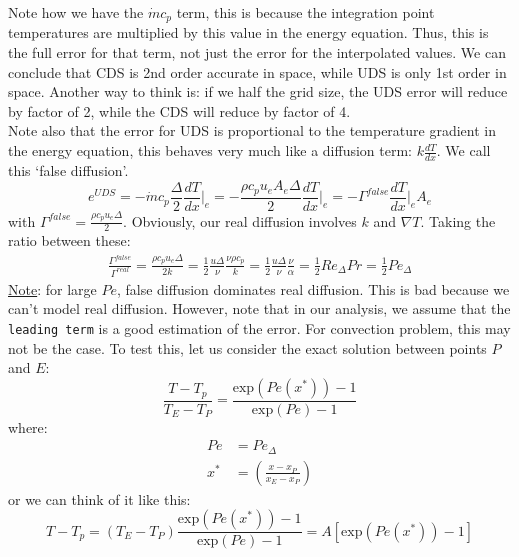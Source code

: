 \documentclass[11pt]{article}
\begin{document}
Note how we have the \(\dot{m}c_p\) term, this is because the integration point temperatures are multiplied by this value in
the energy equation. Thus, this is the full error for that term, not just the error for the interpolated values. We can conclude
that CDS is 2nd order accurate in space, while UDS is only 1st order in space. Another way to think is: if we half the grid size,
the UDS error will reduce by factor of 2, while the CDS will reduce by factor of 4.\\
Note also that the error for UDS is proportional to the temperature gradient in the energy equation, this behaves very much like
a diffusion term: \(k\frac{dT}{dx}\). We call this `false diffusion'.
\begin{equation*}
e^{UDS} = -\dot{m}c_p \frac{\Delta}{2}\frac{dT}{dx}\biggr \rvert_e = -\frac{\rho c_p u_e A_e \Delta}{2}\frac{dT}{dx}\biggr\rvert_e
= -\Gamma^{false}\frac{dT}{dx}\biggr\rvert_e A_e
\end{equation*}
with \(\Gamma^{false} = \frac{\rho c_p u_e \Delta}{2}\). Obviously, our real diffusion involves \(k\) and \(\nabla T\). Taking the ratio
between these:
\begin{equation*}
\begin{aligned}
\frac{\Gamma^{false}}{\Gamma^{real}} = \frac{\rho c_p u_e \Delta}{2k} = \frac{1}{2}\frac{u\Delta}{\nu}\frac{\nu \rho c_p }{k}
= \frac{1}{2}\frac{u\Delta}{\nu}\frac{\nu}{\alpha} = \frac{1}{2}Re_\Delta Pr = \frac{1}{2}Pe_\Delta
\end{aligned}
\end{equation*}
\uline{Note}: for large \(Pe\), false diffusion dominates real diffusion. This is bad because we can't model real diffusion. However,
note that in our analysis, we assume that the \texttt{leading term} is a good estimation of the error. For convection problem, this may
not be the case. To test this, let us consider the exact solution between points \(P\) and \(E\):
\begin{equation*}
\frac{T-T_p}{T_E-T_P} = \frac{\textrm{exp}(Pe (x^*))-1}{\textrm{exp}(Pe)-1}
\end{equation*}
where:
\begin{equation*}
\begin{aligned}
Pe &= Pe_\Delta\\
x^* &= \left( \frac{x-x_P}{x_E-x_P} \right)
\end{aligned}
\end{equation*}
or we can think of it like this:
\begin{equation*}
T-T_p =(T_E-T_P) \frac{\textrm{exp}(Pe (x^*))-1}{\textrm{exp}(Pe)-1} = A[\textrm{exp}(Pe (x^*))-1]
\end{equation*}
\end{document}
